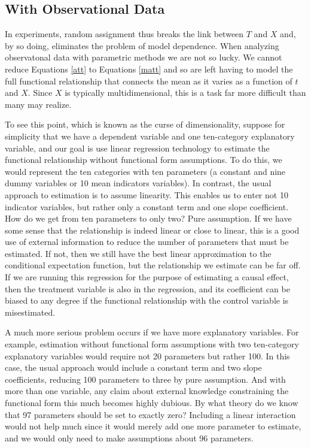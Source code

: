 \documentclass[11pt,titlepage]{article}
\begin{document}
\subsection{With Observational Data}

In experiments, random assignment thus breaks the link between $T$ and
$X$ and, by so doing, eliminates the problem of model dependence.
When analyzing observatonal data with parametric methods we are not so
lucky.  We cannot reduce Equations \ref{att} to Equations \ref{matt}
and so are left having to model the full functional relationship that
connects the mean as it varies as a function of $t$ and $X$.  Since
$X$ is typically multidimensional, this is a task far more difficult
than many may realize.

To see this point, which is known as the curse of dimensionality,
suppose for simplicity that we have a dependent variable and one
ten-category explanatory variable, and our goal is use linear
regression technology to estimate the functional relationship without
functional form assumptions.  To do this, we would represent the ten
categories with ten parameters (a constant and nine dummy variables or
10 mean indicators variables).  In contrast, the usual approach to
estimation is to assume linearity.  This enables us to enter not 10
indicator variables, but rather only a constant term and one slope
coefficient.  How do we get from ten parameters to only two?  Pure
assumption.  If we have some sense that the relationship is indeed
linear or close to linear, this is a good use of external information
to reduce the number of parameters that must be estimated.  If not,
then we still have the best linear approximation to the conditional
expectation function, but the relationship we estimate can be far off.
If we are running this regression for the purpose of estimating a
causal effect, then the treatment variable is also in the regression,
and its coefficient can be biased to any degree if the functional
relationship with the control variable is misestimated.

A much more serious problem occurs if we have more explanatory
variables.  For example, estimation without functional form
assumptions with two ten-category explanatory variables would require
not 20 parameters but rather 100.  In this case, the usual approach
would include a constant term and two slope coefficients, reducing 100
parameters to three by pure assumption.  And with more than one
variable, any claim about external knowledge constraining the
functional form this much becomes highly dubious.  By what theory do
we know that 97 parameters should be set to exactly zero?  Including a
linear interaction would not help much since it would merely add one
more parameter to estimate, and we would only need to make assumptions
about 96 parameters.
\end{document}
